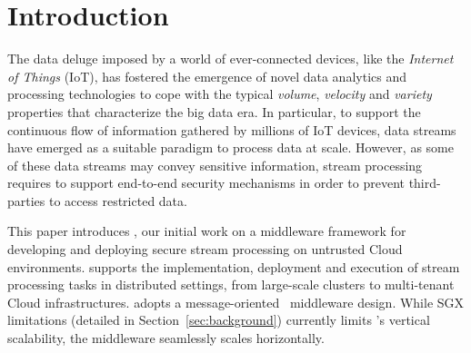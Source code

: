 \section{Introduction}\label{sec:introduction}

The data deluge imposed by a world of ever-connected devices, like the \emph{Internet of Things} (IoT), has fostered the emergence of novel data analytics and processing technologies to cope with the typical \emph{volume}, \emph{velocity} and \emph{variety} properties that characterize the big data era.
In particular, to support the continuous flow of information gathered by millions of IoT devices, data streams have emerged as a suitable paradigm to process data at scale.
However, as some of these data streams may convey sensitive information, stream processing requires to support end-to-end security mechanisms in order to prevent third-parties to access restricted data.

This paper introduces \SYS{}, our initial work on a middleware framework for developing and deploying secure stream processing on untrusted Cloud environments.
\SYS{} supports the implementation, deployment and execution of stream processing tasks in distributed settings, from large-scale clusters to multi-tenant Cloud infrastructures.
\SYS{} adopts a message-oriented~\cite{mom} middleware design.
While SGX limitations (detailed in Section~\ref{sec:background}) currently limits \SYS's vertical scalability, the middleware seamlessly scales horizontally.


